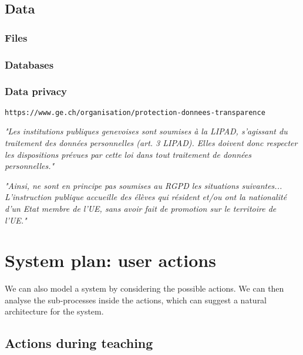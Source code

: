\documentclass[10pt]{article}
\begin{document}
\subsection{Data}

\subsubsection{Files}


\subsubsection{Databases}


\subsubsection{Data privacy} \label{dataprivacy}

\texttt{https://www.ge.ch/organisation/protection-donnees-transparence}

\begin{center} 
\emph{"Les institutions publiques genevoises sont soumises à la LIPAD, s'agissant du traitement des données personnelles (art. 3 LIPAD). Elles doivent donc respecter les dispositions prévues par cette loi dans tout traitement de données personnelles."}\cite[p. 1]{PPDT18}
\end{center}

\begin{center} 
\emph{"Ainsi, ne sont en principe pas soumises au RGPD les situations suivantes... L’instruction publique accueille des élèves qui résident et/ou ont la nationalité d’un Etat membre de l’UE, sans avoir fait de promotion sur le territoire de l’UE."}\cite[p. 3]{PPDT18}
\end{center}



\section{System plan: user actions} \label{actions}

We can also model a system by considering the possible actions. We can then analyse the sub-processes inside the actions, which can suggest a natural architecture for the system.



\subsection{Actions during teaching}
\end{document}
